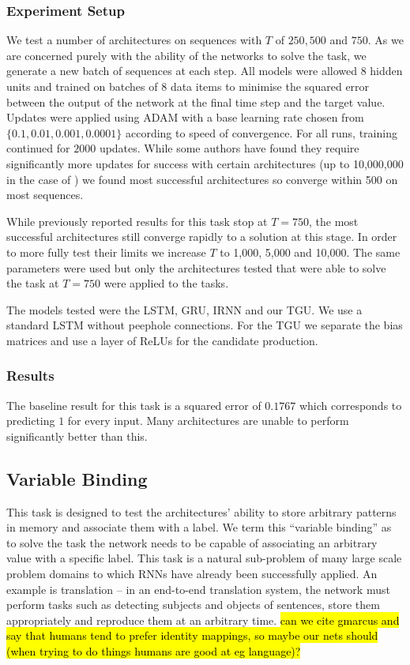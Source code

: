 \subsubsection{Experiment Setup}
We test a number of architectures on sequences with \(T\) of \(250, 500\) and \(750\). As we are
concerned purely with the ability of the networks to solve the task, we generate a new batch of
sequences at each step. All models were allowed \(8\) hidden units and trained on batches of \(8\)
data items to minimise the squared error between the output of the network at the final time step and
the target value. Updates were applied using ADAM \autocite{Kingma2014} with a base learning rate chosen
from \(\{0.1, 0.01, 0.001, 0.0001\}\) according to speed of convergence. For all runs, training continued
for \(2000\) updates. While some authors have found they require significantly more updates for success
with certain architectures (up to 10,000,000 in the case of \autocite{Le2015}) we found most successful
architectures so converge within 500 on most sequences.

While previously reported results for this task stop at \(T=750\), the most successful architectures still
converge rapidly to a solution at this stage. In order to more fully test their limits we increase
\(T\) to 1,000, 5,000 and 10,000. The same parameters were used but only the architectures tested that
were able to solve the task at \(T=750\) were applied to the tasks.

The models tested were the LSTM, GRU, IRNN \autocite{Le2015} and our TGU. We use a standard LSTM without
peephole connections. For the TGU we separate the bias matrices and use a layer of ReLUs for the candidate
production.

\subsubsection{Results}
The baseline result for this task is a squared error of \(0.1767\) which corresponds to predicting
\(1\) for every input. Many architectures are unable to perform significantly better than this.



\subsection{Variable Binding}
This task is designed to test the architectures' ability to store arbitrary patterns in memory and
associate them with a label. We term this ``variable binding'' as to solve the task the network needs
to be capable of associating an arbitrary value with a specific label. This task is a natural
sub-problem of many large scale problem domains to which RNNs have already been successfully applied.
An example is translation -- in an end-to-end translation system, the network must perform tasks such
as detecting subjects and objects of sentences, store them appropriately and reproduce them at an
arbitrary time. \hl{can we cite gmarcus and say that humans tend to prefer identity mappings, so maybe
our nets should (when trying to do things humans are good at eg language)?}

